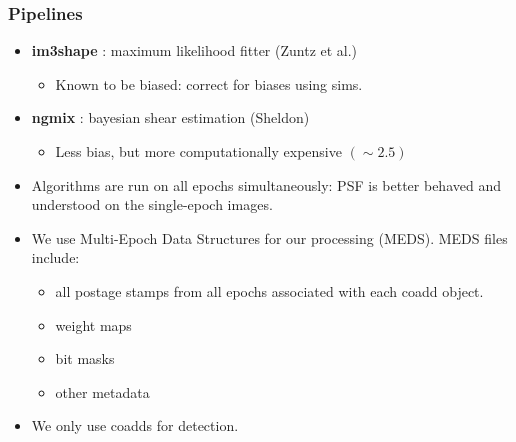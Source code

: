 \documentclass{beamer}
\newcommand{\ngmix}{ {\bf ngmix} }
\newcommand{\imshape}{ {\bf im3shape} }
\begin{document}
\frame
{
    \frametitle{Pipelines}

    \fontsize{9}{0.8\baselineskip}
    \begin{itemize}
        \item \imshape: maximum likelihood fitter (Zuntz et al.)
            \begin{itemize}
                \item Known to be biased: correct for biases using sims.
            \end{itemize}
        \item \ngmix: bayesian shear estimation (Sheldon)
            \begin{itemize}
                \item Less bias, but more computationally expensive $(\sim 2.5)$
            \end{itemize}

        \item Algorithms are run on all epochs simultaneously: PSF is
            better behaved and understood on the single-epoch images.

        \item We use Multi-Epoch Data Structures for our processing (MEDS).
            MEDS files include:
            \begin{itemize}
                \item all postage stamps from all epochs associated with
                    each coadd object.
                \item weight maps
                \item bit masks
                \item other metadata
            \end{itemize}

        \item We only use coadds for detection.

    \end{itemize}
}
\end{document}
